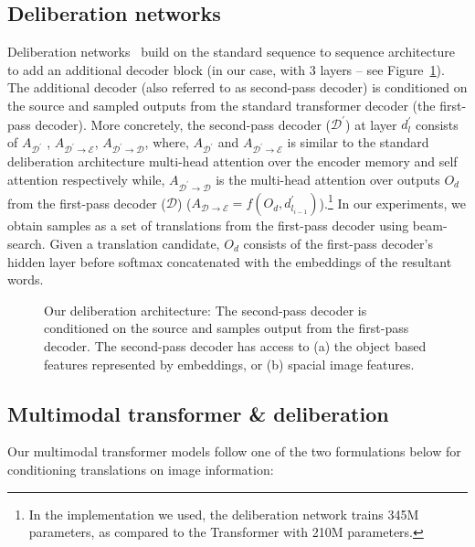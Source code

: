 \documentclass[11pt,a4paper]{article}
\begin{document}
\subsection{Deliberation networks} Deliberation
networks~\cite{hassan2018achieving,xia2017deliberation} build on the standard
sequence to sequence architecture to add an additional decoder block (in our case, with $3$ layers  -- see Figure~\ref{figure:delib}). The additional
decoder (also referred to as second-pass decoder) is conditioned on the source and sampled outputs from the standard transformer decoder (the first-pass decoder). More concretely, the second-pass decoder ($\mathcal{D}^{'}$) at layer $d^{'}_{l}$ consists of $A_{\mathcal{D}^{'}}$ , $A_{\mathcal{D^{'}}{\rightarrow}\mathcal{E}}$, $A_{\mathcal{D^{'}}{\rightarrow}\mathcal{D}}$, where, 
$A_{\mathcal{D}^{'}}$ and $A_{\mathcal{D^{'}}{\rightarrow}\mathcal{E}}$ is similar to the standard deliberation architecture multi-head attention over the encoder memory and self attention respectively while, $A_{\mathcal{D^{'}}{\rightarrow}\mathcal{D}}$ is the multi-head attention over outputs $O_{d}$ from the first-pass decoder ($\mathcal{D}$) ($A_{\mathcal{D}{\rightarrow}\mathcal{E}} = f(O_{d}, d^{'}_{l_{i-1}})$).\footnote{In the implementation we used, the deliberation network trains 345M parameters, as compared to the Transformer with 210M parameters.} In our experiments, we obtain samples as a set of translations from the first-pass decoder using beam-search. Given a translation candidate, $O_{d}$ consists of the first-pass decoder's hidden layer before softmax concatenated with the embeddings of the resultant words.

\begin{figure}[!htbp] 
\caption{Our deliberation architecture: The second-pass
 decoder is conditioned on the source and samples output from the first-pass decoder. The second-pass decoder has access to (a) the object based features represented by embeddings, or (b) spacial image features.}
\label{figure:delib}
\end{figure}

\subsection{Multimodal transformer \& deliberation}\label{ssec:img-models}

Our multimodal transformer models follow one of the two formulations below for conditioning translations on image information:
\end{document}
